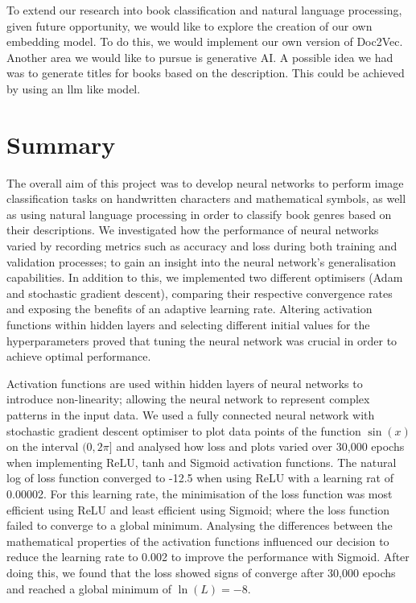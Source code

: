 \documentclass[twocolumn,pra,floatfix]{revtex4-2}
\begin{document}
        To extend our research into book classification and natural language processing,
        given future opportunity, we would like to explore the creation of our own embedding model. To do this, we would implement our own version of Doc2Vec.
        Another area we would like to pursue is generative AI. A possible idea we had was to generate titles for books based on the description. This could be achieved by using an llm like model.
    
    \section{Summary}

        The overall aim of this project was to develop neural networks to perform image classification tasks on handwritten characters and mathematical symbols, as well as using natural language processing in order to classify book genres based on their descriptions. We investigated how the performance of neural networks varied by recording metrics such as accuracy and loss during both training and validation processes; to gain an insight into the neural network's generalisation capabilities. In addition to this, we implemented two different optimisers (Adam and stochastic gradient descent), comparing their respective convergence rates and exposing the benefits of an adaptive learning rate. Altering activation functions within hidden layers and selecting different initial values for the hyperparameters proved that tuning the neural network was crucial in order to achieve optimal performance.

        Activation functions are used within hidden layers of neural networks to introduce non-linearity; allowing the neural network to represent complex patterns in the input data. We used a fully connected neural network with stochastic gradient descent optimiser to plot data points of the function $\sin(x)$ on the interval $(0,2\pi]$ and analysed how loss and plots varied over 30,000 epochs when implementing ReLU, tanh and Sigmoid activation functions. The natural log of loss function converged to -12.5 when using ReLU with a learning rat of 0.00002. For this learning rate, the minimisation of the loss function was most efficient using ReLU and least efficient using Sigmoid; where the loss function failed to converge to a global minimum. Analysing the differences between the mathematical properties of the activation functions influenced our decision to reduce the learning rate to 0.002 to improve the performance with Sigmoid. After doing this, we found that the loss showed signs of converge after 30,000 epochs and reached a global minimum of $\ln(L) = -8$.
        
\end{document}

